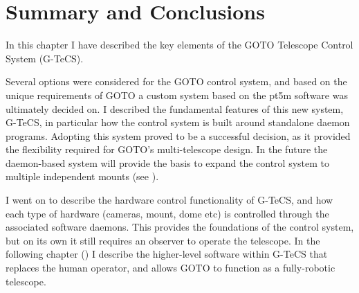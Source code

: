 
\section{Summary and Conclusions}
\label{sec:gtecs_conclusion}


\begin{colsection}

In this chapter I have described the key elements of the GOTO Telescope Control System (G-TeCS).

Several options were considered for the GOTO control system, and based on the unique requirements of GOTO a custom system based on the pt5m software was ultimately decided on. I described the fundamental features of this new system, G-TeCS, in particular how the control system is built around standalone daemon programs. Adopting this system proved to be a successful decision, as it provided the flexibility required for GOTO's multi-telescope design. In the future the daemon-based system will provide the basis to expand the control system to multiple independent mounts (see ).

I went on to describe the hardware control functionality of G-TeCS, and how each type of hardware (cameras, mount, dome etc) is controlled through the associated software daemons. This provides the foundations of the control system, but on its own it still requires an observer to operate the telescope. In the following chapter () I describe the higher-level software within G-TeCS that replaces the human operator, and allows GOTO to function as a fully-robotic telescope.

\end{colsection}

